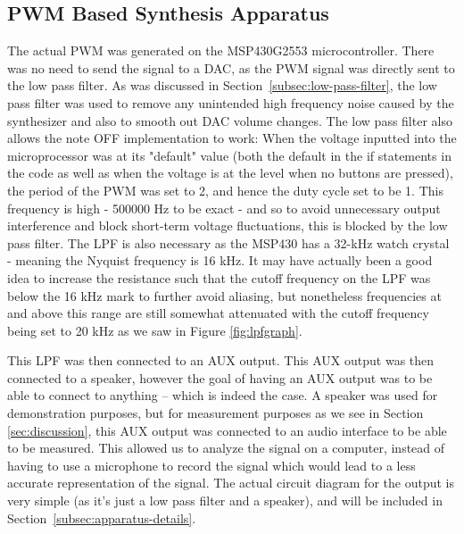 
\subsection{PWM Based Synthesis Apparatus}\label{subsec:pwm-based-synthesis-apparatus}

The actual PWM was generated on the MSP430G2553 microcontroller.
There was no need to send the signal to a DAC, as the PWM signal was directly sent to the low pass filter. 
As was discussed in Section~\ref{subsec:low-pass-filter}, the low pass filter was used to remove any unintended high frequency noise caused by the synthesizer and also to smooth out DAC volume changes. The low pass filter also allows the note OFF implementation to work: When the voltage inputted into the microprocessor was at its "default" value (both the default in the if statements in the code as well as when the voltage is at the level when no buttons are pressed), the period of the PWM was set to 2, and hence the duty cycle set to be 1. This frequency is high - 500000 Hz to be exact - and so to avoid unnecessary output interference and block short-term voltage fluctuations, this is blocked by the low pass filter. The LPF is also necessary as the MSP430 has a 32-kHz watch crystal - meaning the Nyquist frequency is 16 kHz. It may have actually been a good idea to increase the resistance such that the cutoff frequency on the LPF was below the 16 kHz mark to further avoid aliasing, but nonetheless frequencies at and above this range are still somewhat attenuated with the cutoff frequency being set to 20 kHz as we saw in Figure \ref{fig:lpfgraph}. 

This LPF was then connected to an AUX output. 
This AUX output was then connected to a speaker, however the goal of having an AUX output was to be able to connect to anything -- which is indeed the case. A speaker was used for demonstration purposes, but for measurement purposes as we see in Section \ref{sec:discussion}, this AUX output was connected to an audio interface to be able to be measured. This allowed us to analyze the signal on a computer, instead of having to use a microphone to record the signal which would lead to a less accurate representation of the signal.
The actual circuit diagram for the output is very simple (as it's just a low pass filter and a speaker), and will be included in Section~\ref{subsec:apparatus-details}.



